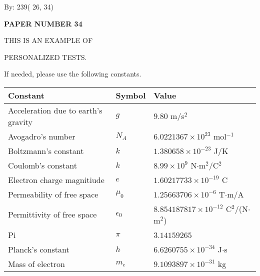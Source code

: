 \documentclass[12pt]{article}
\begin{document}
   
\hspace{1.0in} By: 
         239(         26,          34)
   
   
   
   
\newpage 
\setcounter{page}{ 
    34001 } 
   
   
   
   
 {\textbf{ \Large{ PAPER NUMBER          34 }}}
   
   
\vspace{0.2in}
   
   
   
   
   
   
   
   
 \vspace{0.2in}
 
 
{\Huge  THIS IS AN EXAMPLE OF}
 
{\Huge  PERSONALIZED TESTS. }
 
If needed, please use the following constants.
 
 
 
\noindent\begin{tabular}{|l|l|l|}
\hline
Constant & Symbol & Value \\
\hline
Acceleration due to earth's gravity &
$g$ &
 $ 9.80 $
m/s$^2$ \\
\hline
Avogadro's number &
$N_A$ &
 $ 6.0221367 \times 10^{23} $
mol$^{-1}$ \\
\hline
Boltzmann's constant &
$k$ &
 $ 1.380658 \times 10^{-23} $
J/K \\
\hline
Coulomb's constant &
$k$ &
 $ 8.99 \times 10^{9} $
N$\cdot $m$^2$/C$^2$ \\
\hline
Electron charge magnitiude &
$e$ &
 $ 1.60217733 \times 10^{-19} $
C \\
\hline
Permeability of free space &
$\mu _0$ &
 $ 1.25663706 \times 10^{-6} $
T$\cdot $m/A \\
\hline
Permittivity of free space &
$\epsilon _0$ &
 $ 8.854187817 \times 10^{-12} $
C$^2$/(N$\cdot $m$^2$) \\
\hline
Pi &
$\pi$ &
 $ 3.14159265 $
$ $ \\
\hline
Planck's constant &
$h$ &
 $ 6.6260755 \times 10^{-34} $
J$\cdot $s \\
\hline
Mass of electron &
$m_e$ &
 $ 9.1093897 \times 10^{-31} $
kg \\
\hline
\end{tabular}
 
\end{document}
